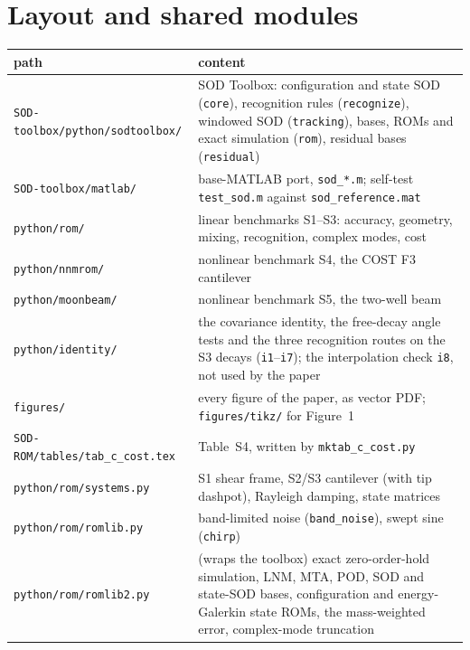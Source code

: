 \documentclass[10pt]{article}
\newcommand{\f}[1]{\texttt{#1}}
\begin{document}
\section{Layout and shared modules}
\begin{longtable}{L{0.30\textwidth}L{0.64\textwidth}}
\toprule
path & content\\ \midrule
\f{SOD-toolbox/\allowbreak{}python/\allowbreak{}sodtoolbox/\allowbreak{}} & SOD Toolbox: configuration and state SOD (\f{core}), recognition rules (\f{recognize}), windowed SOD (\f{tracking}), bases, ROMs and exact simulation (\f{rom}), residual bases (\f{residual})\\
\f{SOD-toolbox/\allowbreak{}matlab/\allowbreak{}} & base-MATLAB port, \f{sod\_\allowbreak{}*.m}; self-test \f{test\_\allowbreak{}sod.m} against \f{sod\_\allowbreak{}reference.mat}\\
\f{python/\allowbreak{}rom/\allowbreak{}} & linear benchmarks S1--S3: accuracy, geometry, mixing, recognition, complex modes, cost\\
\f{python/\allowbreak{}nnmrom/\allowbreak{}} & nonlinear benchmark S4, the COST F3 cantilever\\
\f{python/\allowbreak{}moonbeam/\allowbreak{}} & nonlinear benchmark S5, the two-well beam\\
\f{python/\allowbreak{}identity/\allowbreak{}} & the covariance identity, the free-decay angle tests and the three recognition routes on the S3 decays (\f{i1}--\f{i7}); the interpolation check \f{i8}, not used by the paper\\
\f{figures/\allowbreak{}} & every figure of the paper, as vector PDF; \f{figures/\allowbreak{}tikz/\allowbreak{}} for Figure~1\\
\f{SOD-ROM/\allowbreak{}tables/\allowbreak{}tab\_\allowbreak{}c\_\allowbreak{}cost.tex} & Table~S4, written by \f{mktab\_\allowbreak{}c\_\allowbreak{}cost.py}\\
\f{python/\allowbreak{}rom/\allowbreak{}systems.py} & S1 shear frame, S2/S3 cantilever (with tip dashpot), Rayleigh damping, state matrices\\
\f{python/\allowbreak{}rom/\allowbreak{}romlib.py} & band-limited noise (\f{band\_\allowbreak{}noise}), swept sine (\f{chirp})\\
\f{python/\allowbreak{}rom/\allowbreak{}romlib2.py} & (wraps the toolbox) exact zero-order-hold simulation, LNM, MTA, POD, SOD and state-SOD bases, configuration and energy-Galerkin state ROMs, the mass-weighted error, complex-mode truncation\\

\end{longtable}
\end{document}
